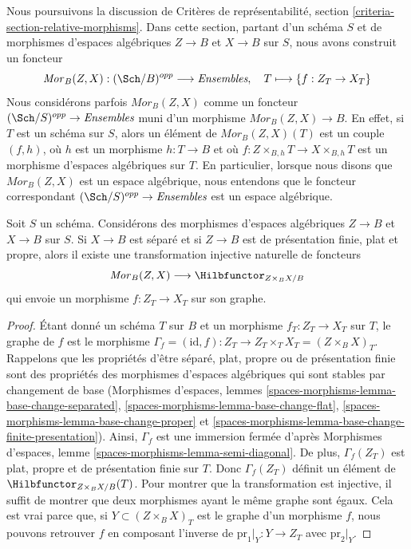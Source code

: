 \noindent
Nous poursuivons la discussion de Critères de représentabilité, section
\ref{criteria-section-relative-morphisms}.
Dans cette section, partant d'un schéma $S$ et de morphismes d'espaces
algébriques $Z \to B$ et $X \to B$ sur $S$, nous avons construit un foncteur
$$
\mathit{Mor}_B(Z, X) : (\Sch/B)^{opp} \longrightarrow \textit{Ensembles}, \quad
T \longmapsto \{f : Z_T \to X_T\}
$$
Nous considérons parfois $\mathit{Mor}_B(Z, X)$ comme un foncteur
$(\Sch/S)^{opp} \to \textit{Ensembles}$ muni d'un morphisme
$\mathit{Mor}_B(Z, X) \to B$.
En effet, si $T$ est un schéma sur $S$, alors un élément de
$\mathit{Mor}_B(Z, X)(T)$ est un couple $(f, h)$, où $h$ est un morphisme
$h : T \to B$ et où
$f : Z \times_{B, h} T \to X \times_{B, h} T$
est un morphisme d'espaces algébriques sur $T$. En particulier, lorsque nous
disons que $\mathit{Mor}_B(Z, X)$ est un espace algébrique, nous entendons que
le foncteur correspondant $(\Sch/S)^{opp} \to \textit{Ensembles}$ est un espace
algébrique.

\begin{lemma}
\label{lemma-Mor-into-Hilb}
Soit $S$ un schéma. Considérons des morphismes d'espaces algébriques
$Z \to B$ et $X \to B$ sur $S$.
Si $X \to B$ est séparé et si $Z \to B$ est de présentation finie,
plat et propre, alors il existe une transformation injective naturelle de
foncteurs
$$
\mathit{Mor}_B(Z, X) \longrightarrow \Hilbfunctor_{Z \times_B X/B}
$$
qui envoie un morphisme $f : Z_T \to X_T$ sur son graphe.
\end{lemma}

\begin{proof}
Étant donné un schéma $T$ sur $B$ et un morphisme $f_T : Z_T \to X_T$
sur $T$, le graphe de $f$ est le morphisme
$\Gamma_f = (\text{id}, f) : Z_T \to Z_T \times_T X_T = (Z \times_B X)_T$.
Rappelons que les propriétés d'être séparé, plat, propre ou de présentation
finie sont des propriétés des morphismes d'espaces algébriques qui sont stables
par changement de base (Morphismes d'espaces, lemmes
\ref{spaces-morphisms-lemma-base-change-separated},
\ref{spaces-morphisms-lemma-base-change-flat},
\ref{spaces-morphisms-lemma-base-change-proper} et
\ref{spaces-morphisms-lemma-base-change-finite-presentation}).
Ainsi, $\Gamma_f$ est une immersion fermée d'après
Morphismes d'espaces, lemme \ref{spaces-morphisms-lemma-semi-diagonal}.
De plus, $\Gamma_f(Z_T)$ est plat, propre et de présentation finie sur $T$.
Donc $\Gamma_f(Z_T)$ définit un élément de
$\Hilbfunctor_{Z \times_B X/B}(T)$.
Pour montrer que la transformation est injective, il suffit de montrer que deux
morphismes ayant le même graphe sont égaux. Cela est vrai parce que, si
$Y \subset (Z \times_B X)_T$ est le graphe d'un morphisme $f$, nous pouvons
retrouver $f$ en composant l'inverse de
$\text{pr}_1|_Y : Y \to Z_T$ avec $\text{pr}_2|_Y$.
\end{proof}

